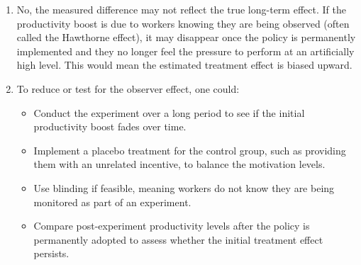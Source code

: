 \documentclass[12pt]{article}
\begin{document}
\begin{enumerate}
\begin{enumerate}[label=(\alph*)]
    \item No, the measured difference may not reflect the true long-term effect. If the productivity boost is due to workers knowing they are being observed (often called the Hawthorne effect), it may disappear once the policy is permanently implemented and they no longer feel the pressure to perform at an artificially high level. This would mean the estimated treatment effect is biased upward.

    \item To reduce or test for the observer effect, one could:
    \begin{itemize}
        \item Conduct the experiment over a long period to see if the initial productivity boost fades over time.
        \item Implement a placebo treatment for the control group, such as providing them with an unrelated incentive, to balance the motivation levels.
        \item Use blinding if feasible, meaning workers do not know they are being monitored as part of an experiment.
        \item Compare post-experiment productivity levels after the policy is permanently adopted to assess whether the initial treatment effect persists.  
    \end{itemize}  

\end{enumerate}  

\fi \color{black}

\end{enumerate}
\end{document}
